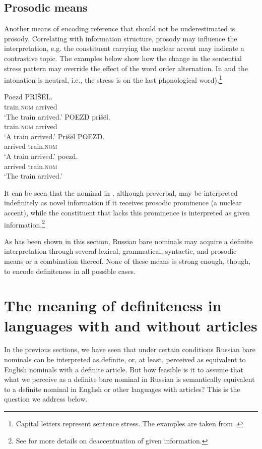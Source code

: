 \documentclass[output=paper,
colorlinks,
citecolor=brown,
newtxmath
]{langscibook}
\begin{document}
\subsection{Prosodic means}
Another means of encoding reference that should not be underestimated is pros\-o\-dy. Correlating with information structure, prosody may influence the interpretation, e.g. the constituent carrying the nuclear accent may indicate a contrastive topic. The examples below show how the change in the sentential stress pattern may override the effect of the word order alternation. In  and  the intonation is neutral, i.e., the stress is on the last phonological word).\footnote{Capital letters represent sentence stress. The examples are taken from \citet[185, examples 1--4]{Pospelov1970}.}

\ea \label{ex:12}
\gll Poezd 		{PRIŠËL}.\\
train.\textsc{nom}	arrived\\
\glt `The train arrived.'\hfill %
\z
\ea \label{ex:13}
\gll	\textsc{POEZD} 		prišël.\\
train.\textsc{nom}    arrived\\
\glt `A train arrived.'\hfill %
\z
\ea \label{ex:14}
\gll	Prišël {POEZD}. \\
arrived train.\textsc{nom}\\
\glt `A train arrived.'\hfill %
\z
\ea \label{ex:15}
 poezd.\\
arrived train.\textsc{nom}\\
\glt `The train arrived.'\hfill %
\z

\noindent It can be seen that the nominal in , although preverbal, may be interpreted indefinitely as novel information if it receives prosodic prominence (a nuclear accent), while the constituent that lacks this prominence is interpreted as given information.\footnote{See \citet{Jasinskaja2016} for more details on deaccentuation of given information.}

As has been shown in this section, Russian bare nominals may acquire a definite interpretation through several lexical, grammatical, syntactic, and prosodic means or a combination thereof. None of these means is strong enough, though, to encode definiteness in all possible cases.

\section{The meaning of definiteness in languages with and without articles}
\label{sec:meaning-definiteness}
In the previous sections, we have seen that under certain conditions Russian bare nominals can be interpreted as definite, or, at least, perceived as equivalent to English nominals with a definite article.
But how feasible is it to assume that what we perceive as a definite bare nominal in Russian is semantically equivalent to a definite %
nominal in English or other languages with articles? This is the question we address below.
\end{document}

